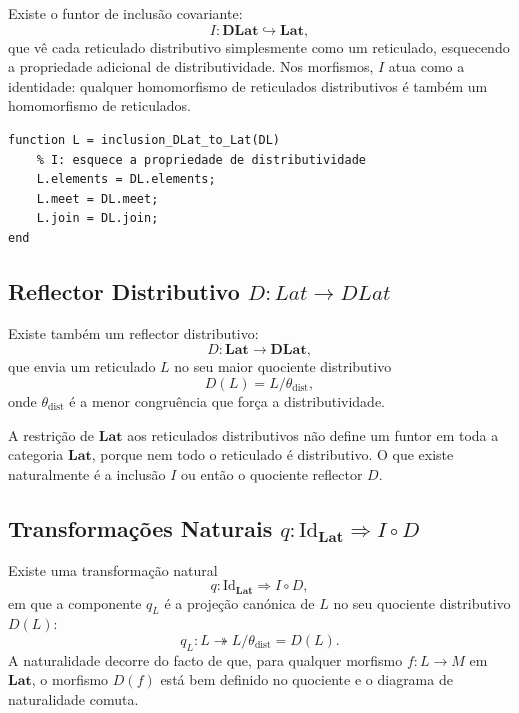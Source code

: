 Existe o funtor de inclusão covariante:
\[
    I: \mathbf{DLat} \hookrightarrow \mathbf{Lat},
\]
que vê cada reticulado distributivo simplesmente como um reticulado, esquecendo a propriedade adicional de distributividade. Nos morfismos, $I$ atua como a identidade: qualquer homomorfismo de reticulados distributivos é também um homomorfismo de reticulados.

\begin{lstlisting}[style=matlab, caption={Funtor de inclusão $I: \mathbf{DLat} \hookrightarrow \mathbf{Lat}$}]
function L = inclusion_DLat_to_Lat(DL)
    % I: esquece a propriedade de distributividade
    L.elements = DL.elements;
    L.meet = DL.meet;
    L.join = DL.join;
end
\end{lstlisting}

\subsection{Reflector Distributivo \texorpdfstring{$D: Lat \to DLat$}{D: Lat -> DLat}}

Existe também um reflector distributivo:
\[
    D: \mathbf{Lat} \to \mathbf{DLat},
\]
que envia um reticulado $L$ no seu maior quociente distributivo
\[
    D(L) = L / \theta_{\mathrm{dist}},
\]
onde $\theta_{\mathrm{dist}}$ é a menor congruência que força a distributividade.

\begin{remark}
A restrição de $\mathbf{Lat}$ aos reticulados distributivos não define um funtor em toda a categoria $\mathbf{Lat}$, porque nem todo o reticulado é distributivo. O que existe naturalmente é a inclusão $I$ ou então o quociente reflector $D$.
\end{remark}

\subsection{Transformações Naturais \texorpdfstring{$q: \mathrm{Id}_{\mathbf{Lat}} \Rightarrow I \circ D$}{q: Id -> I . D}}

Existe uma transformação natural
\[
    q: \mathrm{Id}_{\mathbf{Lat}} \Rightarrow I \circ D,
\]
em que a componente $q_L$ é a projeção canónica de $L$ no seu quociente distributivo $D(L)$:
\[
    q_L: L \twoheadrightarrow L/\theta_{\mathrm{dist}} = D(L).
\]
A naturalidade decorre do facto de que, para qualquer morfismo $f: L \to M$ em $\mathbf{Lat}$, o morfismo $D(f)$ está bem definido no quociente e o diagrama de naturalidade comuta.

